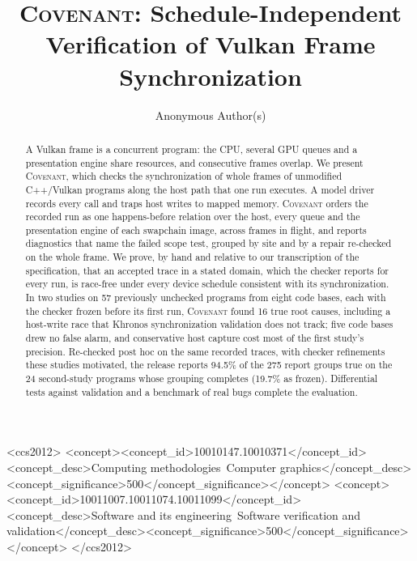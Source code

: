 \documentclass[acmtog,anonymous,review]{acmart}
\newcommand{\sys}{\textsc{Covenant}\xspace}
\begin{document}
\title{\textsc{Covenant}: Schedule-Independent Verification of Vulkan Frame Synchronization}

\author{Anonymous Author(s)}

\begin{abstract}
A Vulkan frame is a concurrent program: the CPU, several GPU queues and a presentation engine share resources, and
consecutive frames overlap. We present \sys, which checks the synchronization of whole frames of unmodified
C++/Vulkan programs along the host path that one run executes. A model driver records every call and traps host
writes to mapped memory. \sys orders the recorded run as one happens-before relation over the host, every queue and
the presentation engine of each swapchain image, across frames in flight, and reports diagnostics that name the
failed scope test, grouped by site and by a repair re-checked on the whole frame. We prove, by hand and relative to
our transcription of the specification, that an accepted trace in a stated domain, which the checker reports for
every run, is race-free under every device schedule consistent with its synchronization. In two studies on 57
previously unchecked programs from eight code bases, each with the checker frozen before its first run, \sys found 16
true root causes, including a host-write race that Khronos synchronization validation does not track; five code
bases drew no false alarm, and conservative host capture cost most of the first study's precision. Re-checked post
hoc on the same recorded traces, with checker refinements these studies motivated, the release reports 94.5\% of the
275 report groups true on the 24 second-study programs whose grouping completes (19.7\% as frozen). Differential tests
against validation and a benchmark of real bugs complete the evaluation.
\end{abstract}

\begin{CCSXML}
<ccs2012>
<concept><concept_id>10010147.10010371</concept_id><concept_desc>Computing methodologies~Computer graphics</concept_desc><concept_significance>500</concept_significance></concept>
<concept><concept_id>10011007.10011074.10011099</concept_id><concept_desc>Software and its engineering~Software verification and validation</concept_desc><concept_significance>500</concept_significance></concept>
</ccs2012>
\end{CCSXML}
\end{document}
